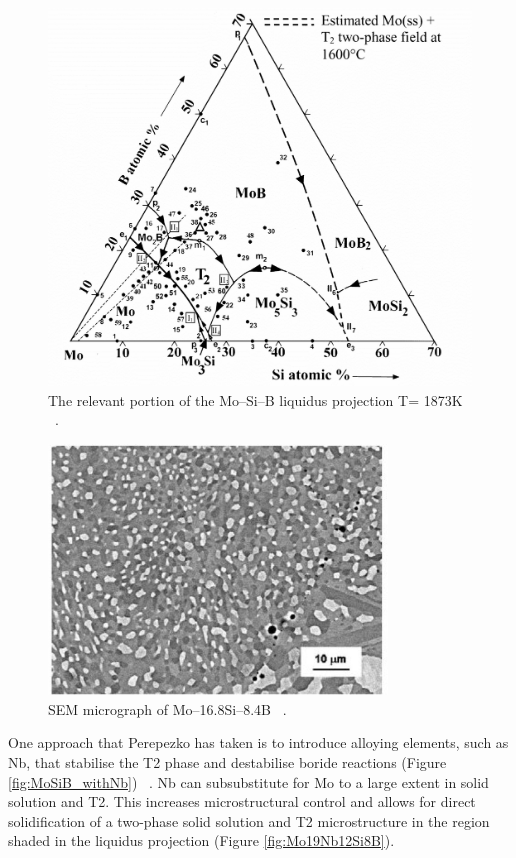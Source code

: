 \begin{figure}[H]
\begin{center}
\includegraphics[width=.9\textwidth]{MoSiB_liquidus}
\vspace{-3mm}
\caption{The relevant portion of the Mo--Si--B liquidus projection T= 1873K ~\cite{perepezko01}.}\label{fig:MoSiB_liquidus}
\end{center}
\end{figure}
\vspace{-5mm} 	
%
\begin{figure}[H]
\begin{center}
\includegraphics[width=9cm]{Mo16Si8B}
\caption{SEM micrograph of Mo--16.8Si--8.4B ~\cite{perepezko01}.}
\label{fig:Mo16Si8B}
\end{center}
\end{figure}
%
One approach that Perepezko has taken is to introduce alloying elements, such as Nb, that stabilise the T2 phase and destabilise boride reactions (Figure \ref{fig:MoSiB_withNb}) ~\cite{perepezko01, sakidja00}. Nb can subsubstitute for Mo to a large extent in solid solution and T2. This increases microstructural control and allows for direct solidification of a two-phase solid solution and T2 microstructure in the region shaded in the liquidus projection (Figure \ref{fig:Mo19Nb12Si8B}). 

